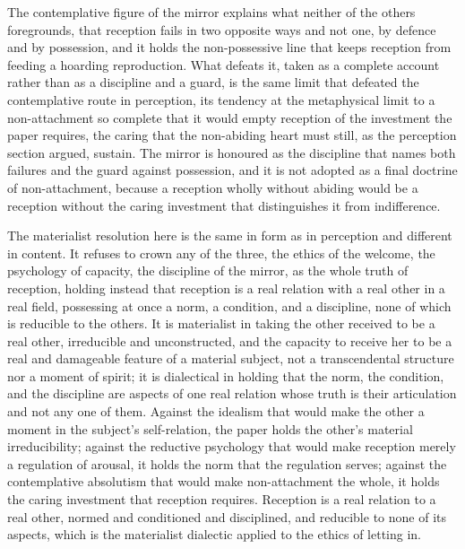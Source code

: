 The contemplative figure of the mirror explains what neither of the others foregrounds, that reception fails in two opposite ways and not one, by defence and by possession, and it holds the non-possessive line that keeps reception from feeding a hoarding reproduction. What defeats it, taken as a complete account rather than as a discipline and a guard, is the same limit that defeated the contemplative route in perception, its tendency at the metaphysical limit to a non-attachment so complete that it would empty reception of the investment the paper requires, the caring that the non-abiding heart must still, as the perception section argued, sustain. The mirror is honoured as the discipline that names both failures and the guard against possession, and it is not adopted as a final doctrine of non-attachment, because a reception wholly without abiding would be a reception without the caring investment that distinguishes it from indifference.

The materialist resolution here is the same in form as in perception and different in content. It refuses to crown any of the three, the ethics of the welcome, the psychology of capacity, the discipline of the mirror, as the whole truth of reception, holding instead that reception is a real relation with a real other in a real field, possessing at once a norm, a condition, and a discipline, none of which is reducible to the others. It is materialist in taking the other received to be a real other, irreducible and unconstructed, and the capacity to receive her to be a real and damageable feature of a material subject, not a transcendental structure nor a moment of spirit; it is dialectical in holding that the norm, the condition, and the discipline are aspects of one real relation whose truth is their articulation and not any one of them. Against the idealism that would make the other a moment in the subject's self-relation, the paper holds the other's material irreducibility; against the reductive psychology that would make reception merely a regulation of arousal, it holds the norm that the regulation serves; against the contemplative absolutism that would make non-attachment the whole, it holds the caring investment that reception requires. Reception is a real relation to a real other, normed and conditioned and disciplined, and reducible to none of its aspects, which is the materialist dialectic applied to the ethics of letting in.
